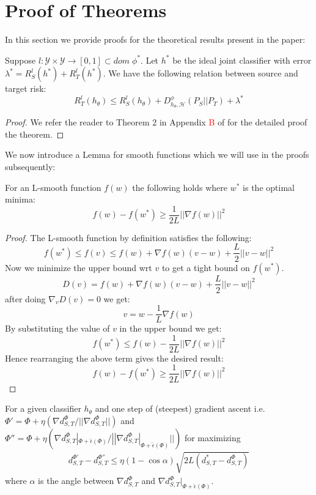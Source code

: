 \documentclass[table,dvipsnames]{article}
\theoremstyle{plain}
\theoremstyle{definition}
\theoremstyle{remark}
\begin{document}
\section{Proof of Theorems}\label{app:proof}
In this section we provide proofs for the theoretical results present in the paper:
\setcounter{theorem}{0}
\begin{theorem}
\label{th:gen-bound}
Suppose $l: \mathcal{Y} \times \mathcal{Y} \rightarrow [0,1] \subset dom \; \phi^*$. Let $h^*$ be the ideal joint classifier with error $\lambda^* = R_S^l(h^*) +  R_T^l(h^*)$. We have the following relation between source and target risk:
\begin{equation}
    R_{T}^l(h_{\theta}) \leq R_{S}^{l}(h_{\theta}) + D_{h_{\theta}, \mathcal{H}}^{\phi} (P_S || P_T) + \lambda^*
\end{equation}
\end{theorem}
\begin{proof}
We refer the reader to Theorem 2 in Appendix \textcolor{red}{B} of \citet{acuna2021f} for the detailed proof the theorem.
\end{proof}
We now introduce a Lemma for smooth functions which we will use in the proofs subsequently:
\setcounter{theorem}{0}
\begin{lemma}
\label{lem:lsmooth}
For an L-smooth function $f(w)$ the following holds where $w^*$ is the optimal minima:
$$
f(w) - f(w^*) \geq \frac{1}{2L}  || \nabla f(w) ||^2
$$
\end{lemma}
\begin{proof}
The L-smooth function by definition satisfies the following:
$$
f(w^*) \leq f(v) \leq f(w) + \nabla f(w) (v - w) + \frac{L}{2}||v - w||^2
$$
Now we minimize the upper bound wrt $v$ to get a tight bound on $f(w^*)$.
$$
D(v) = f(w) + \nabla f(w) (v - w) + \frac{L}{2}||v - w||^2
$$
after doing $\nabla_{v} D(v) = 0$ we get:
$$
v = w - \frac{1}{L} \nabla f(w) 
$$
By substituting the value of $v$ in the upper bound we get:
$$
f(w^*) \leq f(w) - \frac{1}{2L} || \nabla f(w) ||^2
$$
Hence rearranging the above term gives the desired result:
$$
f(w) - f(w^*) \geq \frac{1}{2L}  || \nabla f(w) ||^2
$$

\end{proof}

\setcounter{theorem}{1}
\begin{theorem}
\label{th:suboptimality}
For a given classifier $h_{\theta}$ and one step of (steepest) gradient ascent i.e. $\Phi' = \Phi + \eta (\nabla d_{S,T}^{\Phi}/||\nabla d_{S,T}^{\Phi}||)$ and $\Phi'' = \Phi + \eta (\nabla d_{S,T}^{\Phi}|_{\Phi + \hat{\epsilon}(\Phi)}/||\nabla d_{S,T}^{\Phi}|_{\Phi + \hat{\epsilon}(\Phi)}||)$ for maximizing
\begin{equation}
\begin{split}
         d_{S,T}^{\Phi'} - d_{S,T}^{\Phi''} \leq  \eta(1 - \cos \alpha)\sqrt{2L(d^*_{S,T} - d^{\Phi}_{S,T}) }
\end{split}
\end{equation}
where $\alpha$ is the angle between $\nabla d_{S,T}^{\Phi}$ and $\nabla d_{S,T}^{\Phi}|_{\Phi + \hat{\epsilon}(\Phi)}$. 
\end{theorem}
\end{document}
